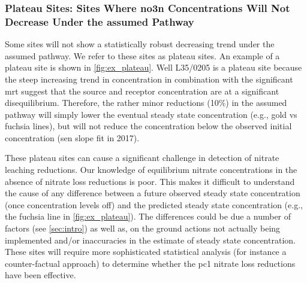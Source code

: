 \subsubsection[Plateau Sites]{Plateau Sites: Sites Where \gls{no3n} Concentrations Will Not Decrease Under the assumed Pathway} \label{sec:plateau_results}



Some sites will not show a statistically robust decreasing trend under the assumed pathway.
We refer to these sites as plateau sites. An example of a plateau site is shown in \autoref{fig:ex_plateau}.
Well L35/0205 is a plateau site because the steep increasing trend in concentration in combination with the significant \gls{mrt} suggest that the source and receptor concentration are at a significant disequilibrium.
Therefore, the rather minor reductions (10\%) in the assumed pathway will simply lower the eventual steady state concentration (e.g., gold vs fuchsia lines), but will not reduce the concentration below the observed initial concentration (sen slope fit in 2017).


These plateau sites can cause a significant challenge in detection of nitrate leaching reductions.
Our knowledge of equilibrium nitrate concentrations in the absence of nitrate loss reductions is poor.
This makes it difficult to understand the cause of any difference between a future observed steady state concentration (once concentration levels off) and the predicted steady state concentration (e.g., the fuchsia line in \autoref{fig:ex_plateau}).
The differences could be due a number of factors (see \autoref{sec:intro}) as well as, on the ground actions not actually being implemented and/or inaccuracies in the estimate of steady state concentration.
These sites will require more sophisticated statistical analysis (for instance a counter-factual approach) to determine whether the \gls{pc1} nitrate loss reductions have been effective.


